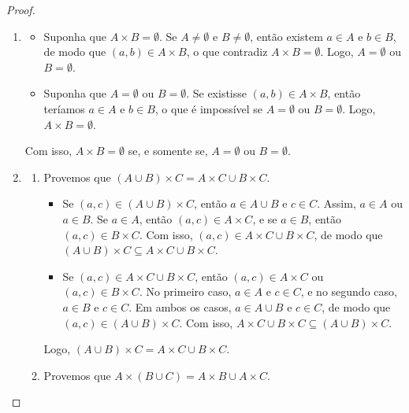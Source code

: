 \begin{proof}
    \leavevmode
        \begin{enumerate}[leftmargin=*, align=left, label=\textbf{(\alph*)}]
            \item 
                \begin{itemize}
                    \item[($\Rightarrow$)] Suponha que $A \times B = \emptyset$. Se $A \neq \emptyset$ e $B \neq \emptyset$, então existem $a \in A$ e $b \in B$, de modo que $(a,b) \in A \times B$, o que contradiz $A \times B = \emptyset$. Logo, $A = \emptyset$ ou $B = \emptyset$.
                    \item[($\Leftarrow$)] Suponha que $A = \emptyset$ ou $B = \emptyset$. Se existisse $(a,b) \in A \times B$, então teríamos $a \in A$ e $b \in B$, o que é impossível se $A = \emptyset$ ou $B = \emptyset$. Logo, $A \times B = \emptyset$.
                \end{itemize}
            Com isso, $A \times B = \emptyset$ se, e somente se, $A = \emptyset$ ou $B = \emptyset$. \blackproof
            \item
                \begin{enumerate}[label=\roman*.]
                    \item Provemos que $(A \cup B) \times C = A \times C \cup B \times C$.
                        \begin{itemize}
                            \item[($\subseteq$)] Se $(a,c) \in (A \cup B) \times C$, então $a \in A \cup B$ e $c \in C$. Assim, $a \in A$ ou $a \in B$. Se $a \in A$, então $(a,c) \in A \times C$, e se $a \in B$, então $(a,c) \in B \times C$. Com isso, $(a,c) \in A \times C \cup B \times C$, de modo que $(A \cup B) \times C \subseteq A \times C \cup B \times C$.
                            \item[($\supseteq$)] Se $(a,c) \in A \times C \cup B \times C$, então $(a,c) \in A \times C$ ou $(a,c) \in B \times C$. No primeiro caso, $a \in A$ e $c \in C$, e no segundo caso, $a \in B$ e $c \in C$. Em ambos os casos, $a \in A \cup B$ e $c \in C$, de modo que $(a,c) \in (A \cup B) \times C$. Com isso, $A \times C \cup B \times C \subseteq (A \cup B) \times C$.
                        \end{itemize}
                    Logo, $(A \cup B) \times C = A \times C \cup B \times C$.
                    \item Provemos que $A \times (B \cup C) = A \times B \cup A \times C$.

\end{enumerate}
\end{enumerate}
\end{proof}
